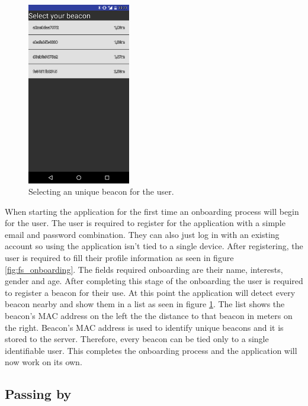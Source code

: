 \begin{figure}[htb]
	\begin{center}
		\includegraphics[width=0.4\textwidth]{registering_beacons.png}
		\caption{Selecting an unique beacon for the user.}
		\label{fig:fs_registerbeacons}
	\end{center}
\end{figure}


When starting the application for the first time an onboarding process will begin for the user. The user is required to register for the application with a simple email and password combination. They can also just log in with an existing account so using the application isn't tied to a single device. After registering, the user is required to fill their profile information as seen in figure \ref{fig:fs_onboarding}. The fields required onboarding are their name,  interests, gender and age. After completing this stage of the onboarding the user is required to register a beacon for their use. At this point the application will detect every beacon nearby and show them in a list as seen in figure \ref{fig:fs_registerbeacons}. The list shows the beacon's MAC address on the left the the distance to that beacon in meters on the right. Beacon's MAC address is used to identify unique beacons and it is stored to the server. Therefore, every beacon can be tied only to a single identifiable user. This completes the onboarding process and the application will now work on its own.

\subsection{Passing by}

